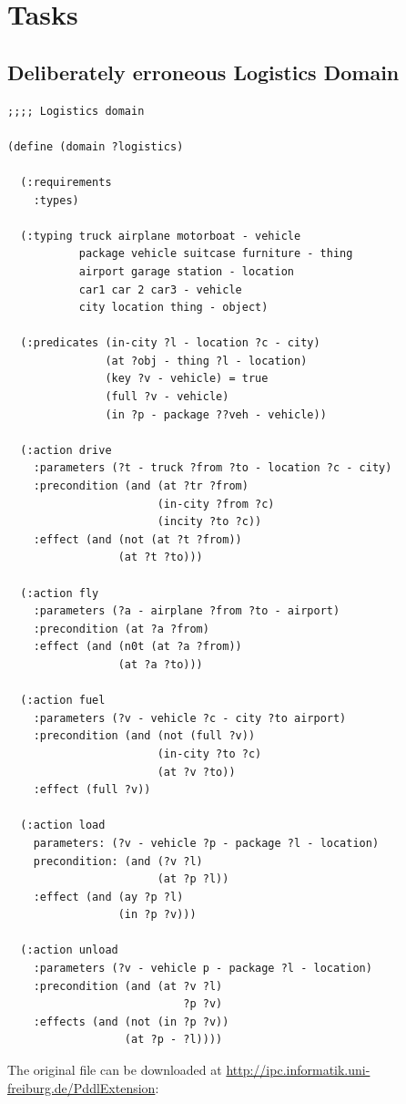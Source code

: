 \documentclass[runningheads]{llncs}
\begin{document}


\newpage
\appendix

\section{Tasks}
\label{sub:tasks}
\subsection{Deliberately erroneous Logistics Domain}
\label{logistics}
\begin{verbatim}
;;;; Logistics domain

(define (domain ?logistics)

  (:requirements
    :types) 

  (:typing truck airplane motorboat - vehicle
           package vehicle suitcase furniture - thing
           airport garage station - location
           car1 car 2 car3 - vehicle
           city location thing - object)

  (:predicates (in-city ?l - location ?c - city)
               (at ?obj - thing ?l - location)
               (key ?v - vehicle) = true
               (full ?v - vehicle)
               (in ?p - package ??veh - vehicle))

  (:action drive
    :parameters (?t - truck ?from ?to - location ?c - city)
    :precondition (and (at ?tr ?from)
                       (in-city ?from ?c)
                       (incity ?to ?c))
    :effect (and (not (at ?t ?from))
                 (at ?t ?to)))

  (:action fly
    :parameters (?a - airplane ?from ?to - airport)
    :precondition (at ?a ?from)
    :effect (and (n0t (at ?a ?from))
                 (at ?a ?to)))

  (:action fuel
    :parameters (?v - vehicle ?c - city ?to airport)
    :precondition (and (not (full ?v))
                       (in-city ?to ?c)
                       (at ?v ?to))
    :effect (full ?v))                   

  (:action load
    parameters: (?v - vehicle ?p - package ?l - location)
    precondition: (and (?v ?l)
                       (at ?p ?l))
    :effect (and (ay ?p ?l)
                 (in ?p ?v)))

  (:action unload
    :parameters (?v - vehicle p - package ?l - location)
    :precondition (and (at ?v ?l)
                           ?p ?v)
    :effects (and (not (in ?p ?v))
                  (at ?p - ?l))))
                \end{verbatim}
The original file can be downloaded at
\url{http://ipc.informatik.uni-freiburg.de/PddlExtension}:
\end{document}
